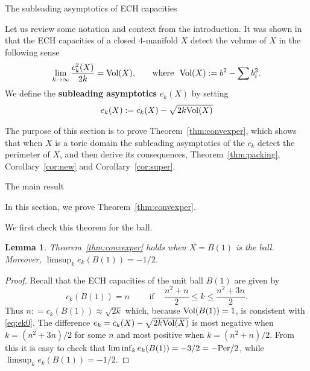 \documentclass[11pt, reqno]{amsart}
\makeatletter
\def\section{\@startsection{section}{1}%
  \z@{.7\linespacing\@plus\linespacing}{.5\linespacing}%
  {\normalfont\Large\bfseries}}
\def\subsection{\@startsection{subsection}{2}%
  \z@{.75\linespacing\@plus.7\linespacing}{-.5em}%
  {\normalfont\large\bfseries}}
\newtheorem{lemma}[thm]{Lemma}
\theoremstyle{remark}
\numberwithin{equation}{subsection}
\numberwithin{figure}{section}
\theoremstyle{customremark}
\newcommand{\Vol}{{\rm Vol}}
\newcommand{\Per}{{\rm Per}}
\makeatother
\begin{document}
\section{The subleading asymptotics of ECH capacities}\label{sec:subECH}

Let us review some notation and context from the introduction.  It was shown in \cite{ECH_volume, Hutchq} that  the ECH capacities of a closed $4$-manifold $X$ detect the volume of $X$ in the following sense
\begin{align}\label{eq:ek0}
\lim_{k\to \infty} \frac{c_k^2(X)}{2k} =  \Vol(X),\;\;\quad \mbox{ where }\  \Vol(X): =  b^2 - \sum b_i^2.
\end{align}
 We define the {\bf subleading asymptotics} $e_k(X)$ 
by setting
\begin{align}\label{eq:ek}
e_k(X): = c_k(X) - \sqrt{ 2k \Vol(X) }
\end{align}

The purpose of this section is to prove Theorem~\ref{thm:convexper}, which shows that when $X$ is a toric domain the  subleading asymptotics of the $c_k$  detect  the perimeter of $X$, and then derive its consequences, Theorem~\ref{thm:packing},  Corollary~\ref{cor:new} and Corollary~\ref{cor:super}.  

\subsection{The main result}\label{ss:asympt}


In this section, we prove Theorem~\ref{thm:convexper}.


We first check this theorem for the ball. 

\begin{lemma}\label{lem:Perball}  Theorem~\ref{thm:convexper}  holds when $X = B(1)$ is the ball. Moreover, 
$\limsup_k e_k(B(1)) = -1/2$.
\end{lemma}
\begin{proof} Recall that the ECH capacities of the unit ball $B(1)$ are given by
$$
c_k(B(1)) = n\qquad \mbox{ if } \;\;\; \frac{n^2+n}2\le k \le \frac{n^2+3n}2.
$$
Thus $n : = c_k(B(1))\approx  \sqrt {2k}$  which, because $\Vol(B(1)) = 1$, is consistent with \eqref{eq:ek0}. The difference 
$e_k = c_k(X) - \sqrt{ 2k \Vol(X) }$ is most negative when $k = 
(n^2+3n)/2$ for some $n$ and most positive when $k = 
(n^2+n)/2$.  From this it is easy to check that $\liminf_k e_k(B(1)) = -3/2 = -\Per/2$, while
$\limsup_k e_k(B(1)) = -1/2$.
\end{proof}
\end{document}

